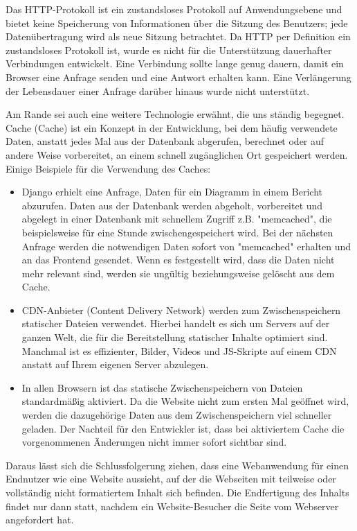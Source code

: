  Das HTTP-Protokoll ist ein zustandsloses Protokoll auf Anwendungsebene und bietet keine Speicherung von Informationen über die Sitzung des Benutzers; jede Datenübertragung wird als neue Sitzung betrachtet. Da HTTP per Definition ein zustandsloses Protokoll ist, wurde es nicht für die Unterstützung dauerhafter Verbindungen entwickelt. Eine Verbindung sollte lange genug dauern, damit ein Browser eine Anfrage senden und eine Antwort erhalten kann. Eine Verlängerung der Lebensdauer einer Anfrage darüber hinaus wurde nicht unterstützt.\cite[p.62]{shklar:webapplication} 

Am Rande sei auch eine weitere Technologie erwähnt, die uns ständig begegnet. Cache (Cache) ist ein Konzept in der Entwicklung, bei dem häufig verwendete Daten, anstatt jedes Mal aus der Datenbank abgerufen, berechnet oder auf andere Weise vorbereitet, an einem schnell zugänglichen Ort gespeichert werden. Einige Beispiele für die Verwendung des Caches:
\begin{itemize}
	\item Django erhielt eine Anfrage, Daten für ein Diagramm in einem Bericht abzurufen. Daten aus der Datenbank werden abgeholt, vorbereitet und abgelegt in einer Datenbank mit schnellem Zugriff z.B. "memcached", die beispielsweise für eine Stunde zwischengespeichert wird. Bei der nächsten Anfrage werden die notwendigen Daten sofort von "memcached" erhalten und an das Frontend gesendet. Wenn es festgestellt wird, dass die Daten nicht mehr relevant sind, werden sie ungültig beziehungsweise gelöscht aus dem Cache.

	\item CDN-Anbieter (Content Delivery Network) werden zum Zwischenspeichern statischer Dateien verwendet. Hierbei handelt es sich um Servers auf der ganzen Welt, die für die Bereitstellung statischer Inhalte optimiert sind. Manchmal ist es effizienter, Bilder, Videos und JS-Skripte auf einem CDN anstatt auf Ihrem eigenen Server abzulegen.

	\item In allen Browsern ist das statische Zwischenspeichern von Dateien standardmäßig aktiviert. Da die Website nicht zum ersten Mal geöffnet wird, werden die dazugehörige Daten aus dem Zwischenspeichern viel schneller geladen. Der Nachteil für den Entwickler ist, dass bei aktiviertem Cache die vorgenommenen Änderungen nicht immer sofort sichtbar sind. 
\end{itemize}

Daraus lässt sich die Schlussfolgerung ziehen, dass eine Webanwendung für einen Endnutzer wie eine Website aussieht, auf der  die Webseiten mit teilweise oder vollständig nicht formatiertem Inhalt sich befinden. Die Endfertigung des Inhalts findet nur dann statt, nachdem ein Website-Besucher die Seite vom Webserver angefordert hat. 

